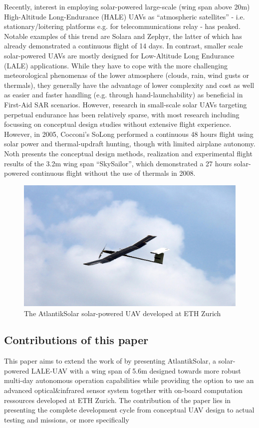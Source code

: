 Recently, interest in employing solar-powered large-scale (wing span above 20m) High-Altitude Long-Endurance (HALE) UAVs as ``atmospheric satellites'' - i.e. stationary/loitering platforms e.g. for telecommunications relay - has peaked. Notable examples of this trend are Solara \cite{IEEE_AtmosphericSatellites} and Zephyr, the latter of which has already demonstrated a continuous flight of 14 days\cite{QinetiQ_Zephyr14dayRecord}. In contrast, smaller scale solar-powered UAVs are mostly designed for Low-Altitude Long Endurance (LALE) applications. While they have to cope with the more challenging meteorological phenomenas of the lower atmosphere (clouds, rain, wind gusts or thermals), they generally have the advantage of lower complexity and cost as well as easier and faster handling (e.g. through hand-launchability) as beneficial in First-Aid SAR scenarios. However, research in small-scale solar UAVs targeting perpetual endurance has been relatively sparse, with most research including \cite{Morton_ICRA2013} focussing on conceptual design studies without extensive flight experience. However, in 2005, Cocconi's SoLong \cite{Cocconi_SoLong} performed a continuous 48 hours flight using solar power and thermal-updraft hunting, though with limited airplane autonomy. Noth\cite{Noth_PhD} presents the conceptual design methods, realization and experimental flight results of the 3.2m wing span ``SkySailor'', which demonstrated a 27 hours solar-powered continuous flight without the use of thermals in 2008. 
\begin{figure}[h]
    \centering
    \includegraphics[width=\linewidth]{images/1_AtlantikSolarCollage}
    \caption{The AtlantikSolar solar-powered UAV developed at ETH Zurich}
    \label{fig:AtlantikSolarCollage}
\end{figure}
\subsection{Contributions of this paper}
This paper aims to extend the work of \cite{Cocconi_SoLong,Noth_PhD} by presenting AtlantikSolar, a solar-powered LALE-UAV with a wing span of 5.6m designed towards more robust multi-day autonomous operation capabilities while providing the option to use an advanced optical\&infrared sensor system together with on-board computation ressources developed at ETH Zurich. The contribution of the paper lies in presenting the complete development cycle from conceptual UAV design to actual testing and missions, or more specifically
  
